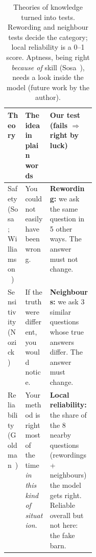 \documentclass[10pt]{article}
\begin{document}
\begin{table}[h]
\centering\scriptsize\vspace{-0.4em}
\begin{tabularx}{\linewidth}{@{}p{0.2\linewidth} Y Y@{}}
\toprule
Theory & The idea in plain words & Our test (fails $\Rightarrow$ right by luck) \\
\midrule
Safety (Sosa~\cite{sosa}; Williamson~\cite{williamson}) & You could not easily have been wrong. & \textbf{Rewording:} we ask the same question in 5 other ways. The answer must not change. \\
Sensitivity (Nozick~\cite{nozick}) & If the truth were different, you would notice. & \textbf{Neighbours:} we ask 3 similar questions whose true answers differ. The answer must change. \\
Reliability (Goldman~\cite{goldman}) & Your method is right most of the time \emph{in this kind of situation}. & \textbf{Local reliability:} the share of the 8 nearby questions (rewordings + neighbours) the model gets right. Reliable overall but not here: the fake barn. \\
\bottomrule
\end{tabularx}
\caption{Theories of knowledge turned into tests. Rewording and neighbour tests decide the category; local reliability is a 0--1 score. Aptness, being right \emph{because of} skill (Sosa~\cite{sosa07}), needs a look inside the model (future work by the author).}
\label{tab:defs}\vspace{-1em}
\end{table}
\end{document}
